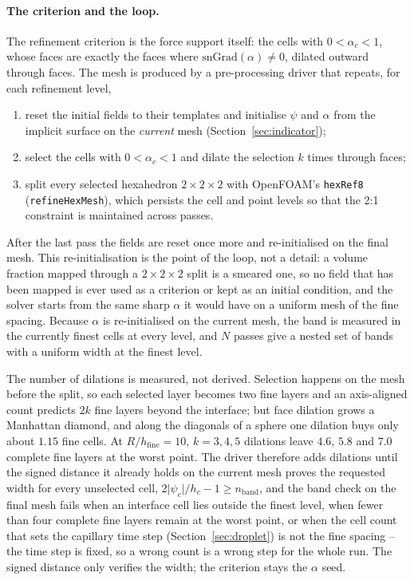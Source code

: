 \documentclass[preprint,3p,11pt]{elsarticle}
\begin{document}
\paragraph{The criterion and the loop.}
The refinement criterion is the force support itself: the cells with $0<\alpha_c<1$,
whose faces are exactly the faces where $\mathrm{snGrad}(\alpha)\neq0$, dilated
outward through faces. The mesh is produced by a pre-processing driver that repeats,
for each refinement level,
\begin{enumerate}
  \item reset the initial fields to their templates and initialise $\psi$ and $\alpha$
        from the implicit surface on the \emph{current} mesh (Section~\ref{sec:indicator});
  \item select the cells with $0<\alpha_c<1$ and dilate the selection $k$ times through
        faces;
  \item split every selected hexahedron $2\times2\times2$ with OpenFOAM's
        \texttt{hexRef8} (\texttt{refineHexMesh}), which persists the cell and point
        levels so that the 2:1 constraint is maintained across passes.
\end{enumerate}
After the last pass the fields are reset once more and re-initialised on the final
mesh. This re-initialisation is the point of the loop, not a detail: a volume fraction
mapped through a $2\times2\times2$ split is a smeared one, so no field that has been
mapped is ever used as a criterion or kept as an initial condition, and the solver
starts from the same sharp $\alpha$ it would have on a uniform mesh of the fine
spacing. Because $\alpha$ is re-initialised on the current mesh, the band is measured in
the currently finest cells at every level, and $N$ passes give a nested set of bands
with a uniform width at the finest level.

The number of dilations is measured, not derived. Selection happens on the mesh before
the split, so each selected layer becomes two fine layers and an axis-aligned count
predicts $2k$ fine layers beyond the interface; but face dilation grows a Manhattan
diamond, and along the diagonals of a sphere one dilation buys only about $1.15$ fine
cells. At $R/h_{\mathrm{fine}}=10$, $k=3,4,5$ dilations leave $4.6$, $5.8$ and $7.0$
complete fine layers at the worst point. The driver therefore adds dilations until the
signed distance it already holds on the current mesh proves the requested width for
every unselected cell, $2\lvert\psi_c\rvert/h_c-1\ge n_{\mathrm{band}}$, and the band
check on the final mesh fails when an interface cell lies outside the finest level,
when fewer than four complete fine layers remain at the worst point, or when the cell
count that sets the capillary time step (Section~\ref{sec:droplet}) is not the fine
spacing -- the time step is fixed, so a wrong count is a wrong step for the whole run.
The signed distance only verifies the width; the criterion stays the $\alpha$ seed.
\end{document}
